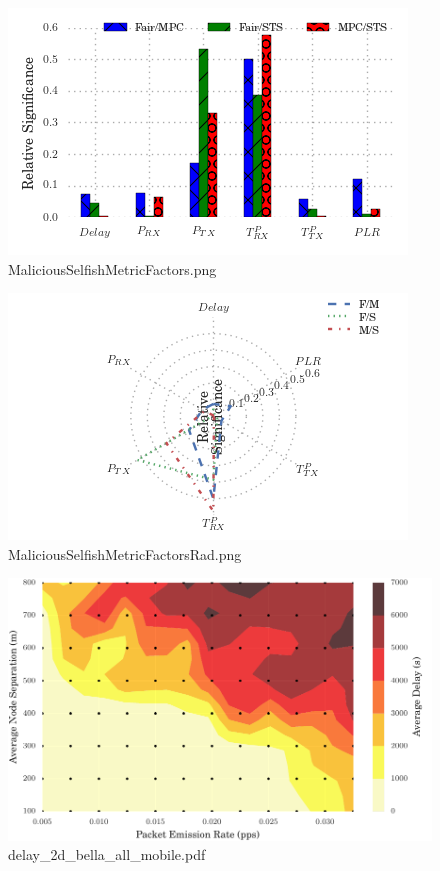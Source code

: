 \documentclass{article}
\begin{document}
\begin{figure}[h!]
\centering
\includegraphics[width=\linewidth]{MaliciousSelfishMetricFactors.png}
\caption{MaliciousSelfishMetricFactors.png}
\end{figure}




\begin{figure}[h!]
\centering
\includegraphics[width=\linewidth]{MaliciousSelfishMetricFactorsRad.png}
\caption{MaliciousSelfishMetricFactorsRad.png}
\end{figure}




\begin{figure}[h!]
\centering
\includegraphics[width=\linewidth]{delay_2d_bella_all_mobile.pdf}
\caption{delay\_2d\_bella\_all\_mobile.pdf}
\end{figure}
\end{document}
